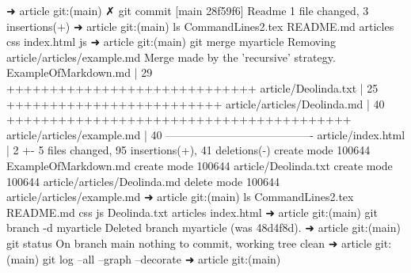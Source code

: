 ➜  article git:(main) ✗ git commit
[main 28f59f6] Readme
 1 file changed, 3 insertions(+)
➜  article git:(main) ls
CommandLines2.tex README.md         articles          css               index.html        js
➜  article git:(main) git merge myarticle
Removing article/articles/example.md
Merge made by the 'recursive' strategy.
 ExampleOfMarkdown.md         | 29 +++++++++++++++++++++++++++++
 article/Deolinda.txt         | 25 +++++++++++++++++++++++++
 article/articles/Deolinda.md | 40 ++++++++++++++++++++++++++++++++++++++++
 article/articles/example.md  | 40 ----------------------------------------
 article/index.html           |  2 +-
 5 files changed, 95 insertions(+), 41 deletions(-)
 create mode 100644 ExampleOfMarkdown.md
 create mode 100644 article/Deolinda.txt
 create mode 100644 article/articles/Deolinda.md
 delete mode 100644 article/articles/example.md
➜  article git:(main) ls                 
CommandLines2.tex README.md         css               js
Deolinda.txt      articles          index.html
➜  article git:(main) git branch -d myarticle
Deleted branch myarticle (was 48d4f8d).
➜  article git:(main) git status
On branch main
nothing to commit, working tree clean
➜  article git:(main) git log --all --graph --decorate
➜  article git:(main) 
